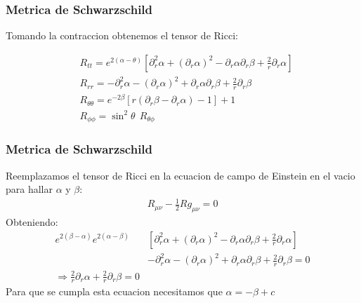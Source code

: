 \documentclass{beamer}
\begin{document}
\begin{frame}
\frametitle{Metrica de Schwarzschild}

Tomando la contraccion obtenemos el tensor de Ricci: 

\begin{align*}
  &R_{t t}=e^{2(\alpha-\theta)}\left[\partial_r^2 \alpha+\left(\partial_r \alpha\right)^2-\partial_r \alpha \partial_r \beta+\frac{2}{r} \partial_r \alpha\right] \\
  &R_{r r}=-\partial_r^2 \alpha-\left(\partial_r \alpha\right)^2+\partial_r \alpha \partial_r \beta+\frac{2}{r} \partial_r \beta \\
  &R_{\theta \theta}=e^{-2 \beta}\left[r\left(\partial_r \beta-\partial_r \alpha\right)-1\right]+1 \\
  &R_{\phi \phi}=\sin ^2 \theta \ \ R_{\theta \phi}
\end{align*}


\end{frame}




\begin{frame}
\frametitle{Metrica de Schwarzschild}
Reemplazamos el tensor de Ricci en la ecuacion de campo de Einstein en el vacio para hallar $ \alpha  $ y $ \beta  $: 
\begin{gather*}
  R _{\mu \nu }  - \frac{1}{2} R g _{\mu \nu }  = 0  
\end{gather*}
Obteniendo: 
\begin{align*}
  e ^ {2 (\beta - \alpha )} e ^ {2 (\alpha - \beta )} &\left[\partial_r^2 \alpha + (\partial_r \alpha )^2 - \partial_r \alpha \partial_r \beta + \frac{2 }{r } \partial_r \alpha \right] \\ 
  &- \partial_r^2 \alpha - (\partial_r \alpha)^2 + \partial_r \alpha \partial_r \beta + \frac{2}{r} \partial_r \beta = 0 \\ 
  \Longrightarrow \frac{2 }{r } \partial_r \alpha + \frac{2 }{r } \partial_r \beta = 0 
\end{align*}
Para que se cumpla esta ecuacion necesitamos que $ \alpha = - \beta + c  $
\end{frame}


\end{document}

